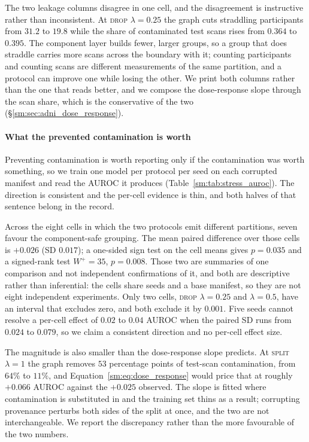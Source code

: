 \documentclass[11pt]{article}
\begin{document}
The two leakage columns disagree in one cell, and the disagreement is
instructive rather than inconsistent. At \textsc{drop} $\lambda = 0.25$ the
graph cuts straddling participants from $31.2$ to $19.8$ while the share of
contaminated test scans rises from $0.364$ to $0.395$. The component layer
builds fewer, larger groups, so a group that does straddle carries more
scans across the boundary with it; counting participants and counting scans
are different measurements of the same partition, and a protocol can improve
one while losing the other. We print both columns rather than the one that
reads better, and we compose the dose-response slope through the scan share,
which is the conservative of the two (\S\ref{sm:sec:adni_dose_response}).





\paragraph{What the prevented contamination is worth}
Preventing contamination is worth reporting only if the contamination was
worth something, so we train one model per protocol per seed on each
corrupted manifest and read the AUROC it produces
(Table~\ref{sm:tab:stress_auroc}). The direction is consistent and the
per-cell evidence is thin, and both halves of that sentence belong in the
record.

Across the eight cells in which the two protocols emit different
partitions, seven favour the component-safe grouping. The mean paired
difference over those cells is $+0.026$ (SD $0.017$); a one-sided sign
test on the cell means gives $p = 0.035$ and a signed-rank test
$W^{+} = 35$, $p = 0.008$. Those two are summaries of one comparison and
not independent confirmations of it, and both are descriptive rather
than inferential: the cells share seeds and a base manifest, so they are
not eight independent experiments. Only two cells, \textsc{drop}
$\lambda = 0.25$ and $\lambda = 0.5$, have an interval that excludes zero,
and both exclude it by $0.001$. Five seeds cannot resolve a per-cell effect
of $0.02$ to $0.04$ AUROC when the paired SD runs from $0.024$ to $0.079$,
so we claim a consistent direction and no per-cell effect size.

The magnitude is also smaller than the dose-response slope predicts. At
\textsc{split} $\lambda = 1$ the graph removes $53$ percentage points of
test-scan contamination, from $64\%$ to $11\%$, and
Equation~\ref{sm:eq:dose_response} would price that at roughly $+0.066$ AUROC
against the $+0.025$ observed. The slope is fitted where contamination is
substituted in and the training set thins as a result; corrupting
provenance perturbs both sides of the split at once, and the two are not interchangeable. We report
the discrepancy rather than the more favourable of the two numbers.
\end{document}
